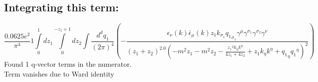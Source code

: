 \subsection*{Integrating this term:}
\begin{dmath}\frac{0.0625 e^{2}}{\pi^{4}}1\int\limits_{ 0 }^{ 1 } d{ z_{ 1 } }\int\limits_{ 0 }^{ - { z_{ 1 } } + 1 } d{ z_{ 2 } }\int\frac{d^d q_1 }{ (2\pi)^4 }\left(- \frac{\epsilon_{ \nu }({ k }) \bar{\epsilon}_{ \mu }({ k }) { z_{ 1 } } { { k }_{ \sigma_1 } } { { q_1 }_{ \sigma_1 } } { \gamma^{ \mu } } { \gamma^{ \sigma_1 } } { \gamma^{ \sigma_2 } } { \gamma^{ \nu } }}{\left({ z_{ 1 } } + { z_{ 2 } }\right)^{2.0} \left(- m^{2} { z_{ 1 } } - m^{2} { z_{ 2 } } - \frac{{ z_{ 1 } }^{2} { { k }_{ \eta } } { { k }^{ \eta } }}{4 { z_{ 1 } } + 4 { z_{ 2 } }} + { z_{ 1 } } { { k }_{ \eta } } { { k }^{ \eta } } + { { q_1 }_{ \eta } } { { q_1 }^{ \eta } }\right)^{2}}\right)\end{dmath}
Found 1 q-vector terms in the numerator.\\
Term vanishes due to Ward identity\\
